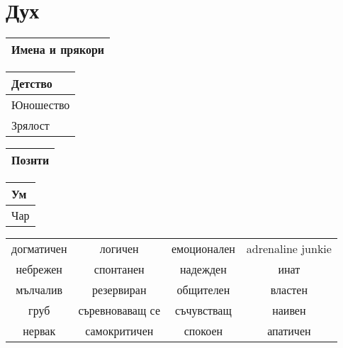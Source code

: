 \documentclass{article}
\begin{document}
\section{Дух}
\extrarowsep=0.5cm
\noindent
\begin{tabular}{|p{\textwidth}|}
\hline
{\tiny Имена и прякори}  \\
\hline
\end{tabular}

\begin{multicols}{2}
\extrarowsep=3cm
\noindent
\begin{tabular}{|p{}|}
\hline
{\tiny Детство}  \\
\hline
{\tiny Юношество}  \\
\hline
{\tiny Зрялост}  \\
\hline
\end{tabular}

\extrarowsep=10cm
\noindent
\begin{tabular}{|p{}|}
\hline
{\tiny Познти}  \\
\hline
\end{tabular}
\end{multicols}

\extrarowsep=1cm
\begin{tabular}{|p{2cm}|}
\hline
{\tiny Ум}  \\
\hline
{\tiny Чар}  \\
\hline
\end{tabular}

\begin{tiny}
\extrarowsep=0.5cm
\noindent
\begin{tabular}{|c c c c|}
\hline
догматичен & логичен & емоционален & adrenaline junkie  \\
небрежен & спонтанен & надежден & инат  \\
мълчалив & резервиран & общителен & властен  \\
груб & съревноваващ се & съчувстващ & наивен  \\
нервак & самокритичен & спокоен & апатичен  \\
\hline
\end{tabular}
\end{tiny}
\end{document}
